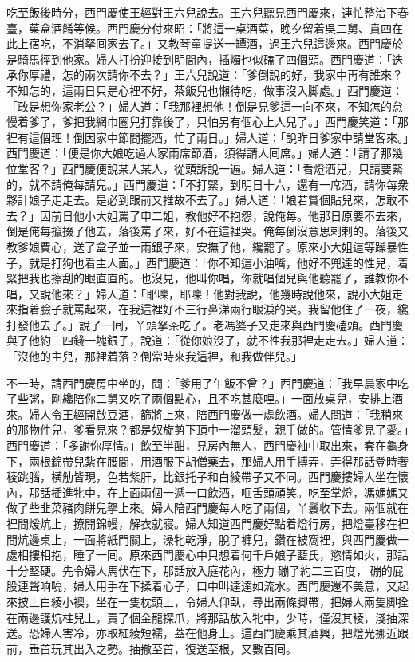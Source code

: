 吃至飯後時分，西門慶使王經對王六兒說去。王六兒聽見西門慶來，連忙整治下春臺，菓盒酒餚等候。西門慶分付來昭：「將這一桌酒菜，晚夕留着吳二舅、賁四在此上宿吃，不消拏囘家去了。」又教琴童提送一罈酒，過王六兒這邊來。西門慶於是騎馬徑到他家。婦人打扮迎接到明間內，插燭也似磕了四個頭。西門慶道：「迭承你厚禮，怎的兩次請你不去？」王六兒說道：「爹倒說的好，我家中再有誰來？不知怎的，這兩日只是心裡不好，茶飯兒也懶待吃，做事沒入脚處。」西門慶道：「敢是想你家老公？」婦人道：「我那裡想他！倒是見爹這一向不來，不知怎的怠慢着爹了，爹把我網巾圈兒打靠後了，只怕另有個心上人兒了。」西門慶笑道：「那裡有這個理！倒因家中節間擺酒，忙了兩日。」婦人道：「說昨日爹家中請堂客來。」西門慶道：「便是你大娘吃過人家兩席節酒，須得請人囘席。」婦人道：「請了那幾位堂客？」西門慶便說某人某人，從頭訴說一遍。婦人道：「看燈酒兒，只請要緊的，就不請俺每請兒。」西門慶道：「不打緊，到明日十六，還有一席酒，請你每衆夥計娘子走走去。是必到跟前又推故不去了。」婦人道：「娘若賞個貼兒來，怎敢不去？」{}因前日他小大姐罵了申二姐，教他好不抱怨，說俺每。他那日原要不去來，倒是俺每攛掇了他去，落後罵了來，好不在這裡哭。俺每倒沒意思剌剌的。落後又教爹娘費心，送了盒子並一兩銀子來，安撫了他，纔罷了。原來小大姐這等躁暴性子，就是打狗也看主人面。」西門慶道：「你不知這小油嘴，他好不兜達的性兒，着緊把我也擦刮的眼直直的。也沒見，他叫你唱，你就唱個兒與他聽罷了，誰教你不唱，又說他來？」婦人道：「耶嚛，耶嚛！他對我說，他幾時說他來，說小大姐走來指着臉子就罵起來，在我這裡好不三行鼻涕兩行眼淚的哭。我留他住了一夜，纔打發他去了。」說了一囘，丫頭拏茶吃了。老馮婆子又走來與西門慶磕頭。西門慶與了他約三四錢一塊銀子，說道：「從你娘沒了，就不徃我那裡走走去。」婦人道：「沒他的主兒，那裡着落？倒常時來我這裡，和我做伴兒。」

不一時，請西門慶房中坐的，問：「爹用了午飯不曾？」西門慶道：「我早晨家中吃了些粥，剛纔陪你二舅又吃了兩個點心，且不吃甚麼哩。」一面放桌兒，安排上酒來。婦人令王經開啟豆酒，篩將上來，陪西門慶做一處飲酒。婦人問道：「我稍來的那物件兒，爹看見來？都是奴旋剪下頂中一溜頭髮，親手做的。管情爹見了愛。」西門慶道：「多謝你厚情。」飲至半酣，見房內無人，西門慶袖中取出來，{}套在龜身下，兩根錦帶兒紮在腰間，用酒服下胡僧藥去，那婦人用手搏弄，弄得那話登時奢稜跳腦，橫觔皆現，色若紫肝，比銀托子和白綾帶子又不同。西門慶摟婦人坐在懷內，那話插進牝中，在上面兩個一遞一口飲酒，咂舌頭頑笑。吃至掌燈，馮媽媽又做了些韭菜豬肉餅兒拏上來。婦人陪西門慶每人吃了兩個，丫鬟收下去。兩個就在裡間煖炕上，撩開錦幔，解衣就寢。婦人知道西門慶好點着燈行房，把燈臺移在裡間炕邊桌上，一面將紙門關上，澡牝乾淨，脫了褲兒，鑽在被窩裡，與西門慶做一處相摟相抱，睡了一囘。{}原來西門慶心中只想着何千戶娘子藍氏，慾情如火，那話十分堅硬。先令婦人馬伏在下，那話放入庭花內，極力𢵞磞了約二三百度，𢵞磞的屁股連聲响喨，婦人用手在下揉着心子，口中叫達達如流水。西門慶還不美意，又起來披上白綾小襖，坐在一隻枕頭上，令婦人仰臥，尋出兩條脚帶，把婦人兩隻脚拴在兩邊護炕柱兒上，賣了個金龍探爪，將那話放入牝中，少時，僅沒其稜，淺抽深送。恐婦人害冷，亦取紅綾短襦，蓋在他身上。這西門慶乘其酒興，把燈光挪近跟前，垂首玩其出入之勢。抽撤至首，復送至根，又數百囘。

